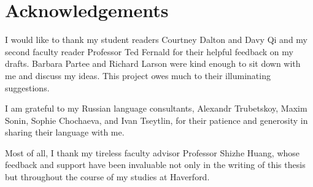 \section*{Acknowledgements}
I would like to thank my student readers Courtney Dalton and Davy Qi and my second faculty reader Professor Ted Fernald for their helpful feedback on my drafts. Barbara Partee and Richard Larson were kind enough to sit down with me and discuss my ideas. This project owes much to their illuminating suggestions.

I am grateful to my Russian language consultants, Alexandr Trubetskoy, Maxim Sonin, Sophie Chochaeva, and Ivan Tseytlin, for their patience and generosity in sharing their language with me.

Most of all, I thank my tireless faculty advisor Professor Shizhe Huang, whose feedback and support have been invaluable not only in the writing of this thesis but throughout the course of my studies at Haverford.